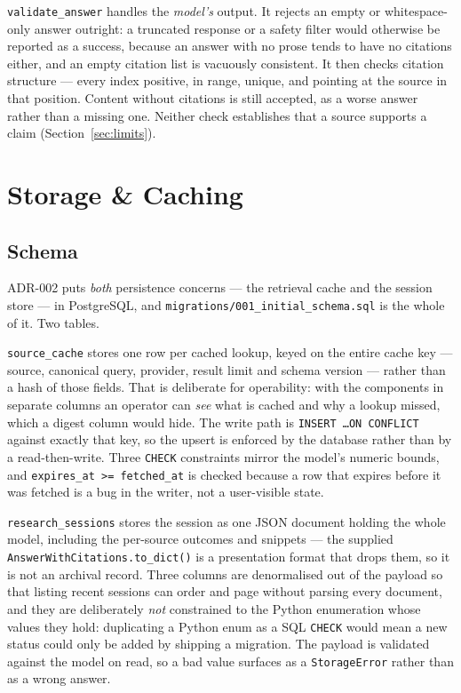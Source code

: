 \documentclass[10pt,a4paper]{article}
\begin{document}
\texttt{validate\_answer} handles the \emph{model's} output. It rejects an empty or
whitespace-only answer outright: a truncated response or a safety filter would otherwise be
reported as a success, because an answer with no prose tends to have no citations either, and an
empty citation list is vacuously consistent. It then checks citation structure --- every index
positive, in range, unique, and pointing at the source in that position. Content without
citations is still accepted, as a worse answer rather than a missing one. Neither check
establishes that a source supports a claim (Section~\ref{sec:limits}).

\section{Storage \& Caching}

\subsection{Schema}

ADR-002 puts \emph{both} persistence concerns --- the retrieval cache and the session store ---
in PostgreSQL, and \texttt{migrations/001\_initial\_schema.sql} is the whole of it. Two tables.

\texttt{source\_cache} stores one row per cached lookup, keyed on the entire cache key --- source,
canonical query, provider, result limit and schema version --- rather than a hash of those
fields. That is deliberate for operability: with the components in separate columns an operator
can \emph{see} what is cached and why a lookup missed, which a digest column would hide. The
write path is \texttt{INSERT \ldots ON CONFLICT} against exactly that key, so the upsert is
enforced by the database rather than by a read-then-write. Three \texttt{CHECK} constraints
mirror the model's numeric bounds, and \texttt{expires\_at >= fetched\_at} is checked because a
row that expires before it was fetched is a bug in the writer, not a user-visible state.

\texttt{research\_sessions} stores the session as one JSON document holding the whole model,
including the per-source outcomes and snippets --- the supplied
\texttt{AnswerWithCitations.to\_dict()} is a presentation format that drops them, so it is not an
archival record. Three columns are denormalised out of the payload so that listing recent
sessions can order and page without parsing every document, and they are deliberately \emph{not}
constrained to the Python enumeration whose values they hold: duplicating a Python enum as a SQL
\texttt{CHECK} would mean a new status could only be added by shipping a migration. The payload
is validated against the model on read, so a bad value surfaces as a \texttt{StorageError}
rather than as a wrong answer.
\end{document}
